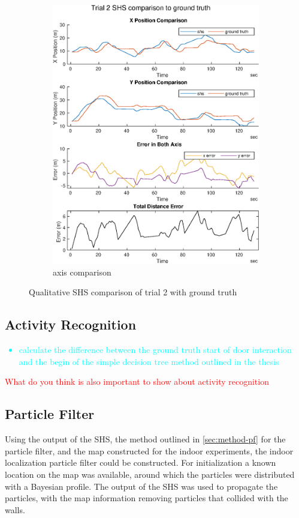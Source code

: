 \begin{figure}[]
\begin{subfigure}[t]{.45\textwidth}
		\includegraphics[width=\linewidth]{images/20201029_1042_trial2_shs_2}
		\caption{axis comparison}
		\label{fig:trial2_comparison}
	\end{subfigure}
	\caption{Qualitative SHS comparison of trial 2 with ground truth}
	\label{fig:trial2_shs_gt_comparison}
\end{figure}

\newpage
\subsection{Activity Recognition}
\textcolor{cyan}{
\begin{itemize}
	\item calculate the difference between the ground truth start of door interaction and the begin of the simple decision tree method outlined in the thesis
\end{itemize}}

\textcolor{red}{What do you think is also important to show about activity recognition}

\subsection{Particle Filter}
Using the output of the SHS, the method outlined in \cref{sec:method-pf} for the particle filter, and the map constructed for the indoor experiments, the indoor localization particle filter could be constructed. For initialization a known location on the map was available, around which the particles were distributed with a Bayesian profile. The output of the SHS was used to propagate the particles, with the map information removing particles that collided with the walls. \\

